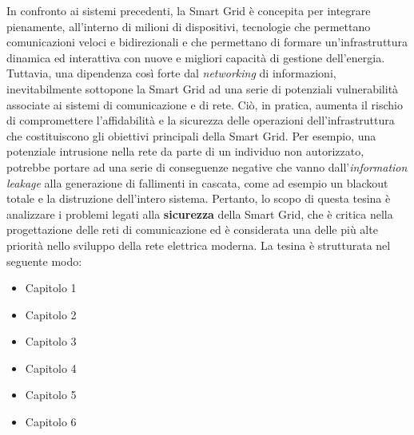 In confronto ai sistemi precedenti, la Smart Grid è concepita per integrare pienamente, all'interno di milioni di dispositivi, tecnologie che permettano comunicazioni veloci e bidirezionali e che permettano di formare un'infrastruttura dinamica ed interattiva con nuove e migliori capacità di gestione dell'energia. Tuttavia, una dipendenza così forte dal \textit{networking} di informazioni, inevitabilmente sottopone la Smart Grid ad una serie di potenziali vulnerabilità associate ai sistemi di comunicazione e di rete. Ciò, in pratica, aumenta il rischio di compromettere l'affidabilità e la sicurezza delle operazioni dell'infrastruttura che costituiscono gli obiettivi principali della Smart Grid. Per esempio, una potenziale intrusione nella rete da parte di un individuo non autorizzato, potrebbe portare ad una serie di conseguenze negative che vanno dall'\textit{information leakage} alla generazione di fallimenti in cascata, come ad esempio un blackout totale e la distruzione dell'intero sistema. \newline Pertanto, lo scopo di questa tesina è analizzare i problemi legati alla \textbf{sicurezza} della Smart Grid, che è critica nella progettazione delle reti di comunicazione ed è considerata una delle più alte priorità nello sviluppo della rete elettrica moderna.
\newline \newline
La tesina è strutturata nel seguente modo:
\begin{itemize}
\item Capitolo 1
\item Capitolo 2
\item Capitolo 3
\item Capitolo 4
\item Capitolo 5
\item Capitolo 6
\end{itemize}

 
